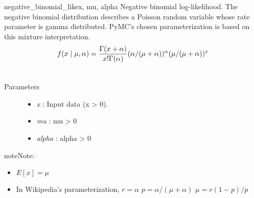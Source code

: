 \hypertarget{pymc.distributions.negative_binomial_like}{}\begin{funcdesc}{negative\_binomial\_like}{x, mu, alpha}
Negative binomial log-likelihood. The negative binomial distribution describes a
Poisson random variable whose rate parameter is gamma distributed. PyMC's chosen
parameterization is based on this mixture interpretation.
\begin{gather}
\begin{split}f(x \mid \mu, \alpha) = \frac{\Gamma(x+\alpha)}{x! \Gamma(\alpha)} (\alpha/(\mu+\alpha))^\alpha (\mu/(\mu+\alpha))^x\end{split}\notag\\\begin{split}\end{split}\notag
\end{gather}\begin{description}
\item[Parameters] \leavevmode\begin{itemize}
\item {}
\emph{x} : Input data (x \textgreater{} 0).

\item {}
\emph{mu} : mu \textgreater{} 0

\item {}
\emph{alpha} : alpha \textgreater{} 0

\end{itemize}

\end{description}

\begin{notice}{note}{Note:}\begin{itemize}
\item {}
$E[x]=\mu$

\item {}
In Wikipedia's parameterization,
$r=\alpha$
$p=\alpha/(\mu+\alpha)$
$\mu=r(1-p)/p$

\end{itemize}
\end{notice}
\end{funcdesc}

